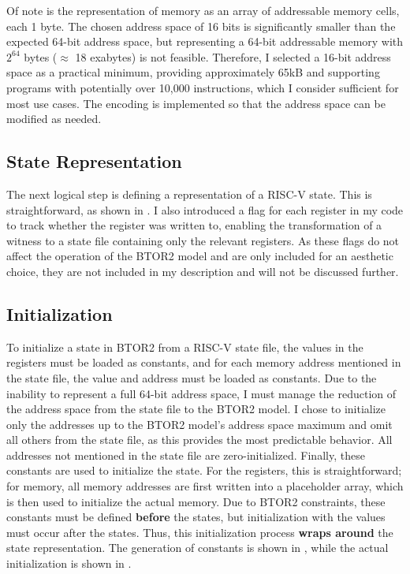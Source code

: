Of note is the representation of memory as an array of addressable
memory cells, each 1 byte. The chosen address space of 16 bits is
significantly smaller than the expected 64-bit address space, but
representing a 64-bit addressable memory with $2^{64}$ bytes
($\approx$ 18 exabytes) is not feasible. Therefore, I selected a
16-bit address space as a practical minimum, providing approximately
65kB and supporting programs with potentially over 10,000
instructions, which I consider sufficient for most use cases. The
encoding is implemented so that the address space can be modified as
needed.  




\subsection{State Representation}
The next logical step is defining a representation of a RISC-V state.
This is straightforward, as shown in . I also
introduced a flag for each register in my code to track whether the
register was written to, enabling the transformation of a witness to
a state file containing only the relevant registers. As these flags
do not affect the operation of the BTOR2 model and are only included
for an aesthetic choice, they are not included in my description and
will not be discussed further.


\subsection{Initialization}\label{sec:initialization}
To initialize a state in BTOR2 from a RISC-V state file, the values
in the registers must be loaded as constants, and for each memory
address mentioned in the state file, the value and address must be
loaded as constants. Due to the inability to represent a full 64-bit
address space, I must manage the reduction of the address space from
the state file to the BTOR2 model. I chose to initialize only the
addresses up to the BTOR2 model's address space maximum and omit all
others from the state file, as this provides the most predictable
behavior. All addresses not mentioned in the state file are
zero-initialized. Finally, these constants are used to initialize the
state. For the registers, this is straightforward; for memory, all
memory addresses are first written into a placeholder array, which is
then used to initialize the actual memory. Due to BTOR2 constraints,
these constants must be defined \textbf{before} the states, but
initialization with the values must occur after the states. Thus,
this initialization process \textbf{wraps around} the state
representation. The generation of constants is shown in
, while the actual
initialization is shown in .



